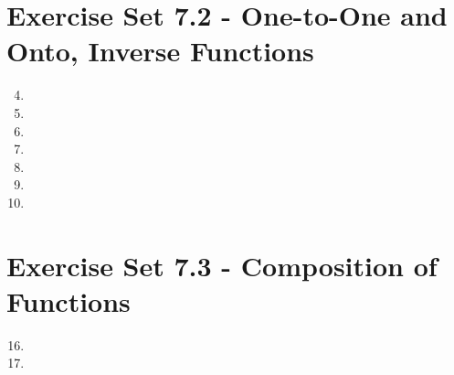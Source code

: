 \documentclass[12pt]{article}
\begin{document}
\section*{Exercise Set 7.2 - One-to-One and Onto, Inverse Functions}
\begin{enumerate}
\setcounter{enumi}{3}
\item %
\item %
\item %
\setcounter{enumi}{14}
\item %
\item %
\setcounter{enumi}{35}
\item %
\item %
\end{enumerate}

\section*{Exercise Set 7.3 - Composition of Functions}
\begin{enumerate}
\setcounter{enumi}{15}
\item %
\item %
\end{enumerate}
\end{document}
